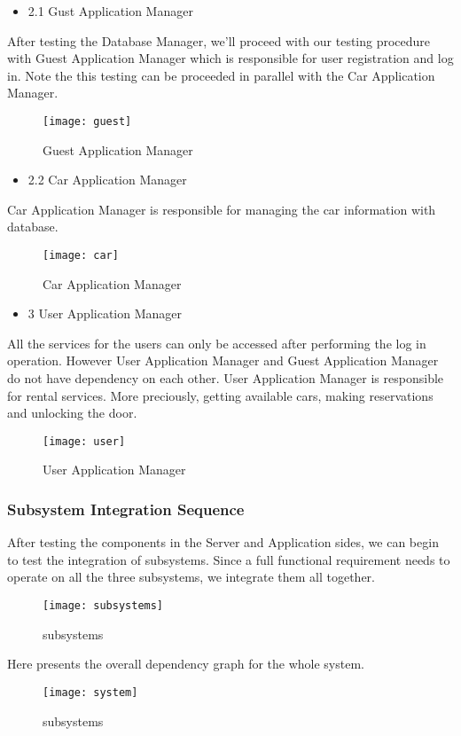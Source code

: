 \documentclass{article}
\begin{document}
 \begin{itemize}
 	\item 2.1 Gust Application Manager
 \end{itemize}
After testing the Database Manager, we'll proceed with our testing procedure with Guest Application Manager which is responsible for user registration and log in.
Note the this testing can be proceeded in parallel with the Car Application Manager.
 \begin{figure}[h]
	\centering
	\texttt{[image: guest]}
	\caption{Guest Application Manager}
\end{figure}
 
  \begin{itemize}
 	\item 2.2 Car Application Manager
 \end{itemize}
Car Application Manager is responsible for managing the car information with database.
\begin{figure}[h]
	\centering
	\texttt{[image: car]}
	\caption{Car Application Manager}
\end{figure}
\begin{itemize}
	\item 3 User Application Manager
\end{itemize}
All the services for the users can only be accessed after performing the log in operation. However User Application Manager and Guest Application Manager do not have dependency on each other. User Application Manager is responsible for rental services. More preciously, getting available cars, making reservations and unlocking the door.
\begin{figure}[h]
	\centering
	\texttt{[image: user]}
	\caption{User Application Manager}
\end{figure}
\newpage
  \subsubsection{Subsystem Integration Sequence}
  After testing the components in the Server and Application sides, we can begin to test the integration of subsystems. Since a full functional requirement needs to operate on all the three subsystems, we integrate them all together.
  \begin{figure}[h]
  	\centering
  	\texttt{[image: subsystems]}
  	\caption{subsystems}
  \end{figure}
\newline
  Here presents the overall dependency graph for the whole system.
    \begin{figure}[h]
  	\centering
  	\texttt{[image: system]}
  	\caption{subsystems}
  \end{figure}
\newpage
\end{document}

